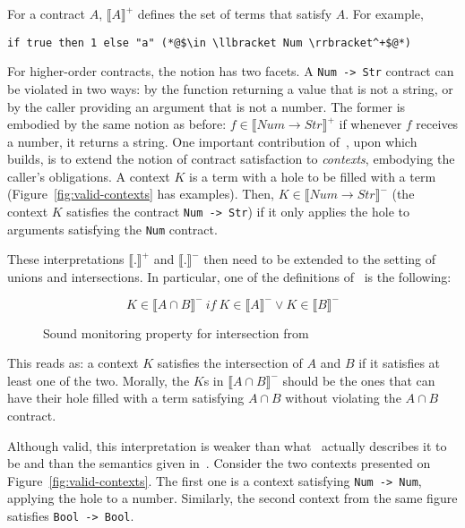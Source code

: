 \documentclass[sigplan,10pt,review,anonymous]{acmart}
\newcommand{\nickel}[1]{\lstinline[language=nickel]{#1}}
\begin{document}
For a contract $A$, $\llbracket A \rrbracket^+$ defines the set of terms that
satisfy $A$. For example,

\begin{lstlisting}[language=nickel,frame=none,numbers=none]
    if true then 1 else "a" (*@$\in \llbracket Num \rrbracket^+$@*)
\end{lstlisting}

For higher-order contracts, the notion has two facets. A \nickel{Num -> Str}
contract can be violated in two ways: by the function returning a value that is
not a string, or by the caller providing an argument that is not a number.  The
former is embodied by the same notion as before: $f \in \llbracket Num \to Str
\rrbracket^+$ if whenever $f$ receives a number, it returns a string.  One
important contribution of~\cite{KeilThiemannUnionIntersection}, upon
which~\cite{RootCauseOfBlame} builds, is to extend the notion of contract
satisfaction to \emph{contexts}, embodying the caller's
obligations. A context $K$ is a term with a hole to be filled with a term (Figure~\ref{fig:valid-contexts} has examples). Then, $K \in \llbracket Num \to
Str \rrbracket^-$ (the context $K$ satisfies the contract \nickel{Num -> Str})
if it only applies the hole to arguments satisfying the \nickel{Num} contract.

These interpretations $\llbracket . \rrbracket^+$ and $\llbracket .
\rrbracket^-$ then need to be extended to the setting of unions and
intersections. In particular, one of the definitions of~\cite{RootCauseOfBlame}
is the following:

\begin{figure}[h]
$$ K \in \llbracket A \cap B \rrbracket^-~if~K \in \llbracket A \rrbracket^- \lor K \in \llbracket B \rrbracket^- $$
\caption{Sound monitoring property for intersection from~\cite{RootCauseOfBlame}}
\label{fig:wmw-semantics}
\end{figure}

This reads as: a context $K$ satisfies the intersection of $A$ and $B$ if it
satisfies at least one of the two. Morally, the $K$s in $\llbracket A \cap B
\rrbracket^-$  should be the ones that can have their hole filled with a term
satisfying $A \cap B$ without violating the $A \cap B$ contract.

Although valid, this interpretation is weaker than what~\cite{RootCauseOfBlame}
actually describes it to be and than the semantics given
in~\cite{KeilThiemannUnionIntersection}. Consider the two contexts presented on
Figure~\ref{fig:valid-contexts}. The first one is a context satisfying
\nickel{Num -> Num}, applying the hole to a number. Similarly, the second context
from the same figure satisfies \nickel{Bool -> Bool}.
\end{document}
